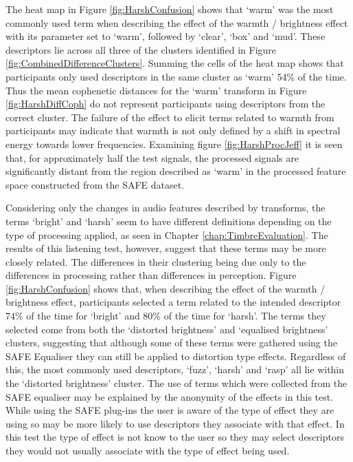			The heat map in Figure \ref{fig:HarshConfusion} shows that `warm' was the most commonly used term
			when describing the effect of the warmth / brightness effect with its parameter set to `warm',
			followed by `clear', `box' and `mud'. These descriptors lie across all three of the clusters
			identified in Figure \ref{fig:CombinedDifferenceClusters}. Summing the cells of the heat map shows
			that participants only used descriptors in the same cluster as `warm' 54\% of the time. Thus the
			mean cophenetic distances for the `warm' transform in Figure \ref{fig:HarshDiffCoph} do not
			represent participants using descriptors from the correct cluster. The failure of the effect to
			elicit terms related to warmth from participants may indicate that warmth is not only defined by a
			shift in spectral energy towards lower frequencies. Examining figure \ref{fig:HarshProcJeff} it is
			seen that, for approximately half the test signals, the processed signals are significantly distant
			from the region described as `warm' in the processed feature space constructed from the SAFE
			dataset.
			
			Considering only the changes in audio features described by transforms, the terms `bright' and
			`harsh' seem to have different definitions depending on the type of processing applied, as seen in
			Chapter \ref{chap:TimbreEvaluation}. The results of this listening test, however, suggest that
			these terms may be more closely related. The differences in their clustering being due only to the
			differences in processing rather than differences in perception. Figure \ref{fig:HarshConfusion}
			shows that, when describing the effect of the warmth / brightness effect, participants selected a
			term related to the intended descriptor 74\% of the time for `bright' and 80\% of the time for
			`harsh'. The terms they selected come from both the `distorted brightness' and `equalised
			brightness' clusters, suggesting that although some of these terms were gathered using the SAFE
			Equaliser they can still be applied to distortion type effects. Regardless of this, the most
			commonly used descriptors, `fuzz', `harsh' and `rasp' all lie within the `distorted brightness'
			cluster. The use of terms which were collected from the SAFE equaliser may be explained by the
			anonymity of the effects in this test. While using the SAFE plug-ins the user is aware of the type
			of effect they are using so may be more likely to use descriptors they associate with that effect.
			In this test the type of effect is not know to the user so they may select descriptors they would
			not usually associate with the type of effect being used.

